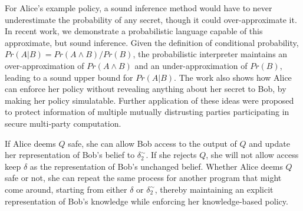 \documentclass{article} %
\newcommand{\pxm}[1]{\textcolor{red}{PM -- #1}}
\newcommand{\sconst}[1]{\ensuremath{\mathsf{#1}}}
\newcommand{\strue}{\sconst{True}}
\newcommand{\sfalse}{\sconst{False}}
\newcommand{\paren}[1]{\left( #1 \right)}
\newcommand{\acond}[0]{|^\sim}
\newcommand{\stacklabel}[1]{\stackrel{\smash{\scriptscriptstyle \mathrm{#1}}}}
\newcommand{\defeq}{\stacklabel{def}=}
\theoremstyle{plain} %
\theoremstyle{definition} %
\begin{document}
For Alice's example policy, a sound inference method would have to
never underestimate the probability of any secret, though it could
over-approximate it. In recent work\cite{mardziel11belief}, we
demonstrate a probabilistic language capable of this approximate, but
sound inference. Given the definition of conditional probability, $
Pr(A | B) = Pr(A \wedge B) / Pr(B) $, the probabilistic interpreter
maintains an over-approximation of $ Pr(A \wedge B) $ and an
under-approximation of $ Pr(B) $, leading to a sound upper bound for $
Pr(A | B) $. The work also shows how Alice can enforce her policy
without revealing anything about her secret to Bob, by making her
policy simulatable\cite{kenthapadi05simulatable}. Further application
of these ideas were proposed to protect information of multiple
mutually distrusting parties participating in secure multi-party
computation\cite{mardziel12smc}.

%
%

%

If Alice deems $ Q $ safe, she can allow Bob access to the output of $
Q $ and update her representation of Bob's belief to $
\delta_2^\sim $. If she rejects $ Q $, she will not allow access keep
$ \delta $ as the representation of Bob's unchanged belief. Whether
Alice deems $ Q $ safe or not, she can repeat the same process for
another program that might come around, starting from either $ \delta
$ or $ \delta_2^\sim $, thereby maintaining an explicit representation
of Bob's knowledge while enforcing her knowledge-based policy.
\end{document}
